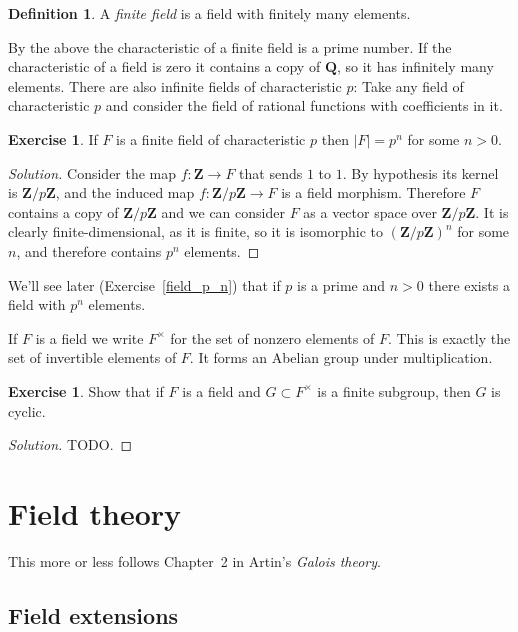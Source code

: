 \documentclass[11pt]{amsart}
\theoremstyle{definition}
\newtheorem{defi}[theo]{Definition}
\newtheorem{e}[theo]{Exercise}
\newenvironment{s}{\begin{proof}[Solution]}{\end{proof}}
\def\QQ{\mathbf{Q}}
\def\ZZ{\mathbf{Z}}
\begin{document}
\begin{defi}
A \emph{finite field} is a field with finitely many elements.
\end{defi}

By the above the characteristic of a finite field is a prime number.
If the characteristic of a field is zero it contains a copy of $\QQ$, so it has infinitely many elements.
There are also infinite fields of characteristic $p$:
Take any field of characteristic $p$ and consider the field of rational functions with coefficients in it.


\begin{e}
If $F$ is a finite field of characteristic $p$ then $|F| = p^n$ for some $n > 0$.
\end{e}

\begin{s}
Consider the map $f : \ZZ \to F$ that sends $1$ to $1$.
By hypothesis its kernel is $\ZZ / p\ZZ$, and the induced map $f : \ZZ / p\ZZ \to F$ is a field morphism.
Therefore $F$ contains a copy of $\ZZ / p\ZZ$ and we can consider $F$ as a vector space over $\ZZ / p \ZZ$.
It is clearly finite-dimensional, as it is finite, so it is isomorphic to $(\ZZ / p \ZZ)^n$ for some $n$, and therefore contains $p^n$ elements.
\end{s}


We'll see later (Exercise~\ref{field_p_n}) that if $p$ is a prime and $n > 0$ there exists a field with $p^n$ elements.

If $F$ is a field we write $F^\times$ for the set of nonzero elements of $F$.
This is exactly the set of invertible elements of $F$.
It forms an Abelian group under multiplication.


\begin{e}
Show that if $F$ is a field and $G \subset F^\times$ is a finite subgroup, then $G$ is cyclic.
\end{e}

\begin{s}
TODO.
\end{s}


\section{Field theory}


This more or less follows Chapter~2 in Artin's \emph{Galois theory}.


\subsection*{Field extensions}
\end{document}
